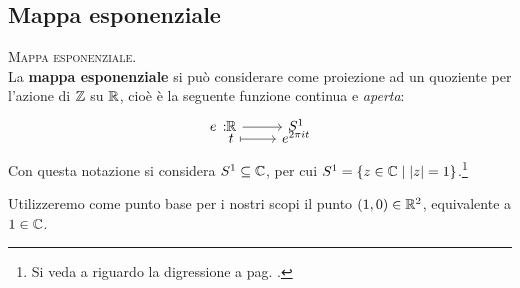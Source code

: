 	\subsection{Mappa esponenziale}
	\begin{define}\textsc{Mappa esponenziale.}\\
		La \textbf{mappa esponenziale} si può considerare come proiezione ad un quoziente per l'azione di $\mathbb{Z}$ su $\mathbb{R}$, cioè è la seguente funzione continua e \textit{aperta}:
		\begin{equation*}
			\funztot e \realset {S^1} t {e^{2\pi i t}}
		\end{equation*}
	Con questa notazione si considera $S^1\subseteq\mathbb{C}$, per cui $S^1=\{z\in\mathbb{C} \mid |z|=1 \}$.\footnote{Si veda a riguardo la digressione a pag. \pageref{complessir2}.}
	\end{define}
Utilizzeremo come punto base per i nostri scopi il punto $(1,0) \in \mathbb{R}^2$, equivalente a $1\in\mathbb{C}$.
